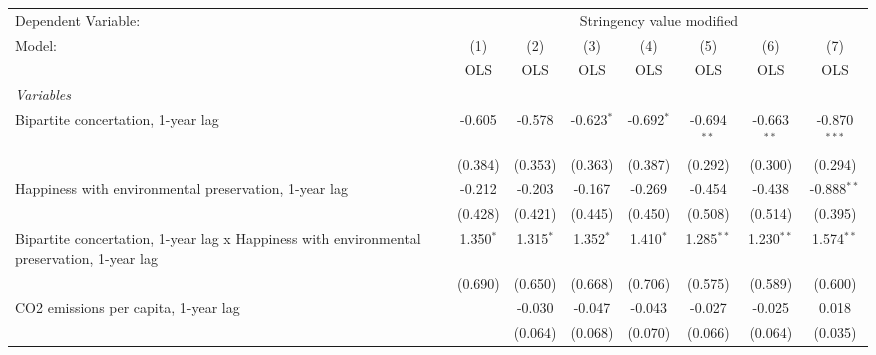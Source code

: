
\begingroup
\centering
\begin{tabular}{lccccccc}
   \toprule
   Dependent Variable: & \multicolumn{7}{c}{Stringency value modified}\\
   Model:                                                                                     & (1)         & (2)         & (3)           & (4)           & (5)           & (6)           & (7)\\  
                                                                                              &  OLS        & OLS         & OLS           & OLS           & OLS           & OLS           & OLS\\  
   \midrule
   \emph{Variables}\\
   Bipartite concertation, 1-year lag                                                         & -0.605      & -0.578      & -0.623$^{*}$  & -0.692$^{*}$  & -0.694$^{**}$ & -0.663$^{**}$ & -0.870$^{***}$\\   
                                                                                              & (0.384)     & (0.353)     & (0.363)       & (0.387)       & (0.292)       & (0.300)       & (0.294)\\   
   Happiness with environmental preservation, 1-year lag                                      & -0.212      & -0.203      & -0.167        & -0.269        & -0.454        & -0.438        & -0.888$^{**}$\\   
                                                                                              & (0.428)     & (0.421)     & (0.445)       & (0.450)       & (0.508)       & (0.514)       & (0.395)\\   
   Bipartite concertation, 1-year lag x Happiness with environmental preservation, 1-year lag & 1.350$^{*}$ & 1.315$^{*}$ & 1.352$^{*}$   & 1.410$^{*}$   & 1.285$^{**}$  & 1.230$^{**}$  & 1.574$^{**}$\\   
                                                                                              & (0.690)     & (0.650)     & (0.668)       & (0.706)       & (0.575)       & (0.589)       & (0.600)\\   
   CO2 emissions per capita, 1-year lag                                                       &             & -0.030      & -0.047        & -0.043        & -0.027        & -0.025        & 0.018\\   
                                                                                              &             & (0.064)     & (0.068)       & (0.070)       & (0.066)       & (0.064)       & (0.035)\\   

\end{tabular}
